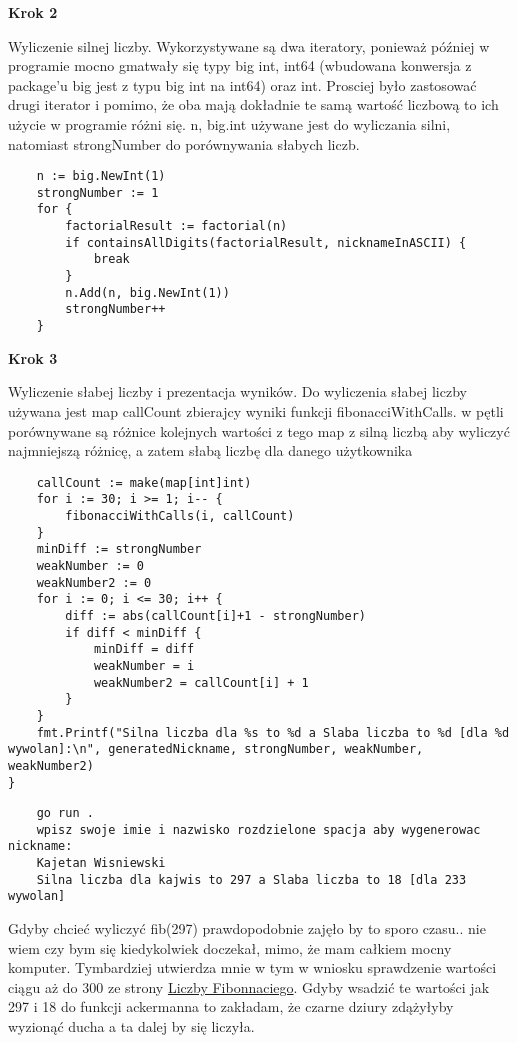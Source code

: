 \documentclass{article}
\begin{document}
\textbf{Krok 2}

Wyliczenie silnej liczby. Wykorzystywane są dwa iteratory, ponieważ później w programie mocno gmatwały się typy big int, int64 (wbudowana konwersja z package'u big jest z typu big int na int64) oraz int. Prosciej było zastosować drugi iterator i pomimo, że oba mają dokładnie te samą wartość liczbową to ich użycie w programie różni się. n, big.int używane jest do wyliczania silni, natomiast strongNumber do porównywania słabych liczb.
\begin{lstlisting}
    n := big.NewInt(1)
	strongNumber := 1
	for {
		factorialResult := factorial(n)
		if containsAllDigits(factorialResult, nicknameInASCII) {
			break
		}
		n.Add(n, big.NewInt(1))
		strongNumber++
	}
\end{lstlisting}

\newpage
\textbf{Krok 3}

Wyliczenie słabej liczby i prezentacja wyników. Do wyliczenia słabej liczby używana jest map callCount zbierajcy wyniki funkcji fibonacciWithCalls. w pętli porównywane są różnice kolejnych wartości z tego map z silną liczbą aby wyliczyć najmniejszą różnicę, a zatem słabą liczbę dla danego użytkownika

\begin{lstlisting}
    callCount := make(map[int]int)
	for i := 30; i >= 1; i-- {
		fibonacciWithCalls(i, callCount)
	}
	minDiff := strongNumber
	weakNumber := 0
	weakNumber2 := 0
	for i := 0; i <= 30; i++ {
		diff := abs(callCount[i]+1 - strongNumber)
		if diff < minDiff {
			minDiff = diff
			weakNumber = i
			weakNumber2 = callCount[i] + 1
		}
	}
	fmt.Printf("Silna liczba dla %s to %d a Slaba liczba to %d [dla %d wywolan]:\n", generatedNickname, strongNumber, weakNumber, weakNumber2)
}    
\end{lstlisting}
\begin{lstlisting}
    go run .
    wpisz swoje imie i nazwisko rozdzielone spacja aby wygenerowac nickname:
    Kajetan Wisniewski
    Silna liczba dla kajwis to 297 a Slaba liczba to 18 [dla 233 wywolan]
\end{lstlisting}

Gdyby chcieć wyliczyć fib(297) prawdopodobnie zajęło by to sporo czasu.. nie wiem czy bym się kiedykolwiek doczekał, mimo, że mam całkiem mocny komputer. Tymbardziej utwierdza mnie w tym w wniosku sprawdzenie wartości ciągu aż do 300 ze strony \href{https://r-knott.surrey.ac.uk/Fibonacci/fibtable.html}{Liczby Fibonnaciego}. Gdyby wsadzić te wartości jak 297 i 18 do funkcji ackermanna to zakładam, że czarne dziury zdążyłyby wyzionąć ducha a ta dalej by się liczyła.
\end{document}
